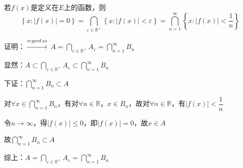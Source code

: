 \begin{eg}
    若$f(x)$是定义在$E$上的函数，则
    $$\left\{x : \left\lvert f(x)\right\rvert = 0\right\} = \bigcap \limits_{\varepsilon \in \mathbb{R}^{+}} \left\{x : \left\lvert f(x)\right\rvert < \varepsilon \right\} = \bigcap \limits_{n=1}^{\infty} \left\{x : \left\lvert f(x)\right\rvert < \dfrac{1}{n} \right\} $$
\end{eg}
\noindent 证明：$\xrightarrow{regard \ as} \ A = \bigcap \limits_{\varepsilon \in \mathbb{R}^{+}}A_{\varepsilon } = \bigcap \limits_{n=1}^{\infty} B_{n}$
\par 显然：$A \subset \bigcap \limits_{\varepsilon \in \mathbb{R}^{+}}A_{\varepsilon } \subset \bigcap \limits_{n=1}^{\infty} B_{n}$
\par 下证：$\bigcap \limits_{n=1}^{\infty} B_{n} \subset A$
\par 对$\forall x \in \bigcap \limits_{n=1}^{\infty} B_{n} $，有对$\forall n \in \mathbb{R}$，$x \in B_{n}$，故对$\forall n \in \mathbb{R}$，有$\left\lvert f(x)\right\rvert < \dfrac{1}{n} $
\par 令$n \to \infty$，得$\left\lvert f(x)\right\rvert \leqslant 0$，即$\left\lvert f(x)\right\rvert = 0$，故$x \in A$
\par 故$\bigcap \limits_{n=1}^{\infty} B_{n} \subset A$
\par 综上：$ A = \bigcap \limits_{\varepsilon \in \mathbb{R}^{+}}A_{\varepsilon } = \bigcap \limits_{n=1}^{\infty} B_{n}$

